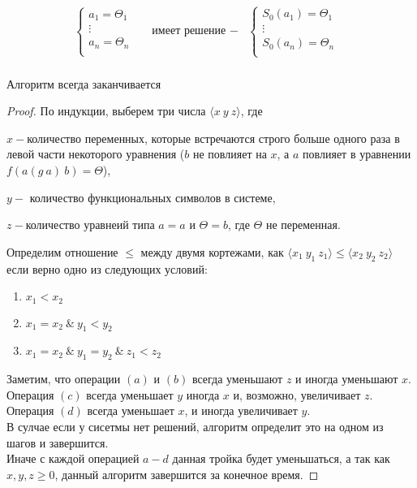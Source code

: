 	\begin{align*}
		\begin{cases}
			a_1=\Theta_1&\\
			\vdots&\\
			a_n=\Theta_n&\\
		\end{cases} & \text{имеет решение }-&\begin{cases}
			S_0(a_1)=\Theta_1&\\
			\vdots&\\
			S_0(a_n)=\Theta_n&\\
		\end{cases}\\
	\end{align*}
	\begin{statement}Алгоритм всегда заканчивается\end{statement}
	\begin{proof}По индукции, выберем три числа $ \big \langle x\:y\:z\big \rangle$, где\par $x-$количество переменных, которые встречаются строго больше одного раза в левой части некоторого уравнения ($b$ не повлияет на $x$, а $a$ повлияет в уравнении $f(a(g\:a)\:b)=\Theta$),\par $y-$ количество функциональных символов в системе,\par $z-$количество уравнеий типа $a=a$ и $\Theta=b$, где $\Theta$ не переменная.\par Определим отношение $\leq$  между двумя кортежами,	 как $\big \langle x_1\:y_1\:z_1\big \rangle \leq \big \langle x_2\:y_2\:z_2\big \rangle$ если верно одно из следующих условий:\\ \begin{enumerate}
	\item $x_1 < x_2$
	\item $x_1 = x_2 \:\& \:y_1 < y_2$
	\item $x_1 = x_2 \:\&  \:y_1 = y_2 \:\& \:z_1 < z_2$
	\end{enumerate}
		Заметим, что операции $(a)$ и $(b)$ всегда уменьшают $z$ и иногда уменьшают $x$.\\ Операция $(c)$ всегда уменьшает $y$ иногда $x$ и, возможно, увеличивает $z$. \\
		Операция $(d)$ всегда уменьшает $x$, и иногда увеличивает $y$. \\
		В сулчае если у сисетмы нет решений, алгоритм определит это на одном из шагов и завершится. \\
		Иначе с каждой операцией $a-d$ данная тройка будет уменьшаться, а так как $x,y,z\geq 0$, данный алгоритм завершится за конечное время.
		\end{proof} 

